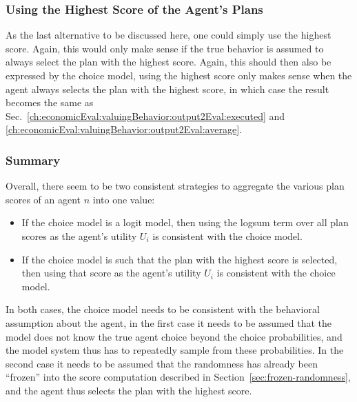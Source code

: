 

\subsubsection{Using the Highest Score of the Agent's Plans}
As the last alternative to be discussed here, one could simply use the highest score.  Again, this would only make sense if the true behavior is assumed to always select the plan with the highest score.  Again, this should then also be expressed by the choice model, \ie using the highest score only makes sense when the agent always selects the plan with the highest score, in which case the result becomes the same as Sec.~\ref{ch:economicEval:valuingBehavior:output2Eval:executed} and \ref{ch:economicEval:valuingBehavior:output2Eval:average}.

\subsubsection{Summary}
\label{ch:economicEval:valuingBehavior:output2Eval:summary}

Overall, there seem to be two consistent strategies to aggregate the various plan scores of an agent $n$ into one value:
\begin{itemize}\styleItemize

\item If the choice model is a logit model, then using the logsum term over all plan scores as the agent's utility $U_i$ is consistent with the choice model.

\item If the choice model is such that the plan with the highest score is selected, then using that score as the agent's utility $U_i$ is consistent with the choice model.

\end{itemize}
In both cases, the choice model needs to be consistent with the behavioral assumption about the agent, \ie in the first case it needs to be assumed that the model does not know the true agent choice beyond the choice probabilities, and the model system thus has to repeatedly sample from these probabilities.  In the second case it needs to be assumed that the randomness has already been ``frozen'' into the score computation described in Section~\ref{sec:frozen-randomness}, and the agent thus selects the plan with the highest score.

